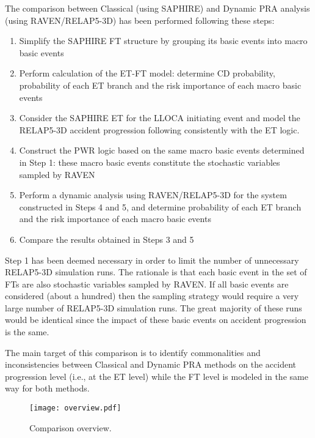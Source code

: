 The comparison between Classical (using SAPHIRE) and Dynamic PRA analysis (using RAVEN/RELAP5-3D)
has been performed following these steps:
\begin{enumerate}
	\item Simplify the SAPHIRE FT structure by grouping its basic events into macro basic events
	\item Perform calculation of the ET-FT model: determine CD probability, probability of each ET branch and the 
	      risk importance of each macro basic events
	\item Consider the SAPHIRE ET for the LLOCA initiating event and model the RELAP5-3D accident 
	      progression following consistently with the ET logic. 
	\item Construct the PWR logic based on the same macro basic events determined in Step 1: these
	      macro basic events constitute the stochastic variables sampled by RAVEN 
	\item Perform a dynamic analysis using RAVEN/RELAP5-3D for the system constructed in Steps 4 
	      and 5, and  determine probability of each ET branch and the risk importance of each
	      macro basic events
	\item Compare the results obtained in Steps 3 and 5
\end{enumerate}

Step 1 has been deemed necessary in order to limit the number of unnecessary RELAP5-3D simulation runs.
The rationale is that each basic event in the set of FTs are also stochastic variables sampled by RAVEN.
If all basic events are considered (about a hundred) then the sampling strategy would require a very large
number of RELAP5-3D simulation runs. The great majority of these runs would be identical since the
impact of these basic events on accident progression is the same.

The main target of this comparison is to identify commonalities and inconsistencies between Classical 
and Dynamic PRA methods on the accident progression level (i.e., at the ET level) while the FT level is 
modeled in the same way for both methods.

\begin{figure}
    \centering
    \texttt{[image: overview.pdf]}
    \caption{Comparison overview.}
    \label{fig:overview}
\end{figure} 
